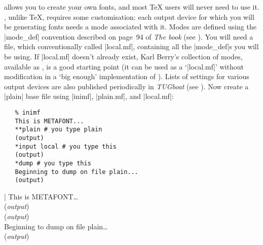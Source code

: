 \MF{} allows you to create your own fonts, and most \TeX{} users
will never need to use it. \MF{}, unlike \TeX{}, requires some
customisation: each output device for which you will be generating
fonts needs a mode associated with it. Modes are defined using the
|mode_def| convention described on page~94 of \emph{The \MF{}book}
(see ). You will need
a file, which conventionally called \File|local.mf|, containing all the
|mode_def|s you will be using. If \File|local.mf| doesn't already
exist, Karl Berry's collection of modes,
available as , is a good starting point 
(it can be used as a `\File|local.mf|' without modification in a `big
enough' implementation of \MF{}). Lists of
settings for various output devices are also published periodically in
\textsl{TUGboat} (see ). Now create
a |plain| base
file using \ProgName|inimf|, |plain.mf|, and |local.mf|:
\begin{htmlversion}
\begin{verbatim}
   % inimf
   This is METAFONT...
   **plain # you type plain
   (output)
   *input local # you type this
   (output)
   *dump # you type this
   Beginning to dump on file plain...
   (output)
\end{verbatim}
\end{htmlversion}
\htmlignore
\par\vspace{\topsep}
\begin{list}{}{}\item\relax
  |%
  This is METAFONT\dots{}\\{}
  (\emph{output})\\{}
  (\emph{output})\\{}
  Beginning to dump on file plain\dots{}\\{}
  (\emph{output})
\end{list}\par

